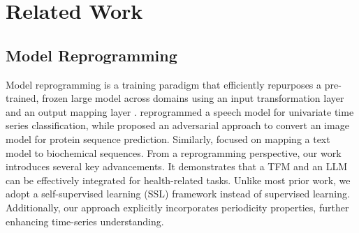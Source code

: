 \section{Related Work}
\subsection{Model Reprogramming}

Model reprogramming is a training paradigm that efficiently repurposes a pre-trained, frozen large model across domains using an input transformation layer and an output mapping layer \citep{chen2024model}. \citet{yang2021voice2series} reprogrammed a speech model for univariate time series classification, while \citet{neekhara2022cross} proposed an adversarial approach to convert an image model for protein sequence prediction. Similarly, \citet{vinod2023reprogramming} focused on mapping a text model to biochemical sequences. From a reprogramming perspective, our work introduces several key advancements. It demonstrates that a TFM and an LLM can be effectively integrated for health-related tasks. Unlike most prior work, we adopt a self-supervised learning (SSL) framework instead of supervised learning. Additionally, our approach explicitly incorporates periodicity properties, further enhancing time-series understanding.



